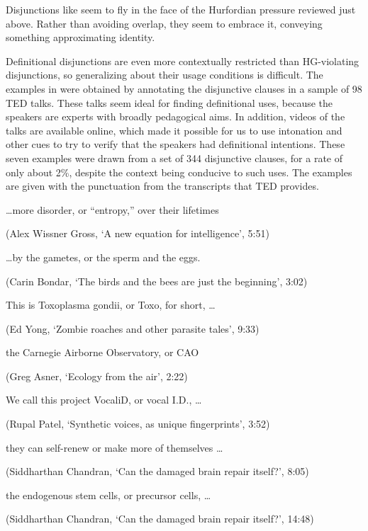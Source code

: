 \documentclass[12pt,twoside]{article}
\renewcommand{\_}{\textbf{\textunderscore\hspace{-4pt}\textunderscore\hspace{-3pt}\textunderscore\hspace{-4pt}\textunderscore}\hspace{0.5pt}}			%
\begin{document}
Disjunctions like  seem to fly in the
face of the Hurfordian pressure reviewed just above. Rather than
avoiding overlap, they seem to embrace it, conveying something
approximating identity.

Definitional disjunctions are even more contextually restricted than
HG-violating disjunctions, so generalizing about their usage
conditions is difficult.  The examples in  were obtained by
annotating the disjunctive clauses in a sample of 98 TED talks. These
talks seem ideal for finding definitional uses, because the speakers
are experts with broadly pedagogical aims. In addition, videos of the
talks are available online, which made it possible for us to use
intonation and other cues to try to verify that the speakers had
definitional intentions. These seven examples were drawn from a set of
344 disjunctive clauses, for a rate of only about 2\%, despite the
context being conducive to such uses. The examples are given with the
punctuation from the transcripts that TED provides.
%
\begin{exe}
  \ex\label{ted}
  \begin{xlist}
    \ex \ldots more disorder, or ``entropy,'' over their lifetimes 
    
    (Alex Wissner Gross, `A new equation for intelligence', 5:51)

    \ex \ldots by the gametes, or the sperm and the eggs.

    (Carin Bondar, `The birds and the bees are just the beginning', 3:02)

    \ex This is Toxoplasma gondii, or Toxo, for short, \ldots

    (Ed Yong, `Zombie roaches and other parasite tales', 9:33)

    \ex the Carnegie Airborne Observatory, or CAO

    (Greg Asner, `Ecology from the air', 2:22)

    \ex We call this project VocaliD, or vocal I.D., \ldots

    (Rupal Patel, `Synthetic voices, as unique fingerprints', 3:52)

    \newpage

    \ex they can self-renew or make more of themselves \ldots

    (Siddharthan Chandran, `Can the damaged brain repair itself?', 8:05)

    \ex the endogenous stem cells, or precursor cells, \ldots

    (Siddharthan Chandran, `Can the damaged brain repair itself?', 14:48)
  \end{xlist}
\end{exe}
\end{document}
